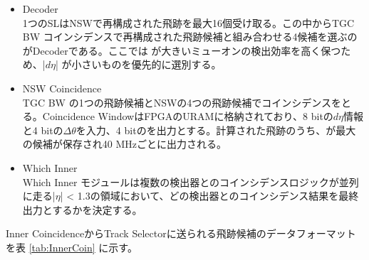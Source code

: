\begin{itemize}
    \item Decoder\\
    1つのSLはNSWで再構成された飛跡を最大16個受け取る。この中からTGC BW コインシデンスで再構成された飛跡候補と組み合わせる4候補を選ぶのがDecoderである。ここでは \pt が大きいミューオンの検出効率を高く保つため、|$d\eta$| が小さいものを優先的に選別する。
    \item NSW Coincidence\\
    TGC BW の1つの飛跡候補とNSWの4つの飛跡候補でコインシデンスをとる。Coincidence WindowはFPGAのURAMに格納されており、8 bitの$d\eta$情報と4 bitの$\Delta\theta$を入力、4 bitの\pt を出力とする。計算された飛跡のうち、\pt が最大の候補が保存され40 MHzごとに出力される。
    \item Which Inner\\
    Which Inner モジュールは複数の検出器とのコインシデンスロジックが並列に走る|$\eta$| < 1.3の領域において、どの検出器とのコインシデンス結果を最終出力とするかを決定する。
\end{itemize}
Inner CoincidenceからTrack Selectorに送られる飛跡候補のデータフォーマットを表 \ref{tab:InnerCoin} に示す。

